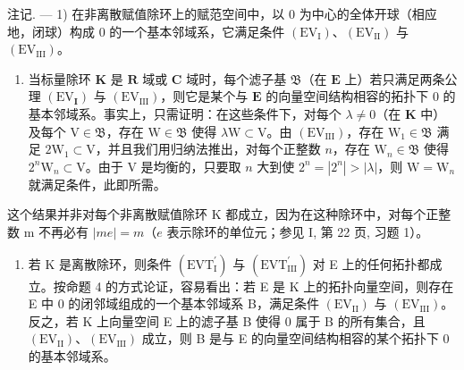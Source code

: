 注记. --- 1) 在非离散赋值除环上的赋范空间中，以 0 为中心的全体开球（相应地，闭球）构成 0 的一个基本邻域系，它满足条件 \((\mathrm{EV}_{\mathrm{I}})\)、\((\mathrm{EV}_{\mathrm{II}})\) 与 \((\mathrm{EV}_{\mathrm{III}})\)。

\begin{enumerate}
\def\labelenumi{\arabic{enumi})}
\setcounter{enumi}{1}
\tightlist
\item
  当标量除环 \(\mathbf{K}\) 是 \(\mathbf{R}\) 域或 \(\mathbf{C}\) 域时，每个滤子基 \(\mathfrak{B}\)（在 \(\mathbf{E}\) 上）若只满足两条公理 \((\mathrm{EV}_{\mathbf{I}})\) 与 \((\mathrm{EV}_{\mathrm{III}})\)，则它是某个与 \(\mathbf{E}\) 的向量空间结构相容的拓扑下 0 的基本邻域系。事实上，只需证明：在这些条件下，对每个 \(\lambda \neq 0\)（在 \(\mathbf{K}\) 中）及每个 \(\mathrm{V} \in \mathfrak{B}\)，存在 \(\mathrm{W} \in \mathfrak{B}\) 使得 \(\lambda \mathrm{W} \subset \mathrm{V}\)。由 \((\mathrm{EV}_{\mathrm{III}})\)，存在 \(\mathrm{W}_{1} \in \mathfrak{B}\) 满足 \(2\mathrm{W}_{1} \subset \mathrm{V}\)，并且我们用归纳法推出，对每个正整数 \(n\)，存在 \(\mathrm{W}_{n} \in \mathfrak{B}\) 使得 \(2^{n}\mathrm{W}_{n} \subset \mathrm{V}\)。由于 \(\mathrm{V}\) 是均衡的，只要取 \(n\) 大到使 \(2^{n} = |2^{n}| > |\lambda|\)，则 \(\mathrm{W} = \mathrm{W}_{n}\) 就满足条件，此即所需。
\end{enumerate}

这个结果并非对每个非离散赋值除环 K 都成立，因为在这种除环中，对每个正整数 m 不再必有 \(|me| = m\)（\(e\) 表示除环的单位元；参见 I, 第 22 页, 习题 1）。

\begin{enumerate}
\def\labelenumi{\arabic{enumi})}
\setcounter{enumi}{2}
\tightlist
\item
  若 K 是离散除环，则条件 \((\mathrm{EVT}_{\mathrm{I}}^{\prime})\) 与 \((\mathrm{EVT}_{\mathrm{III}}^{\prime})\) 对 E 上的任何拓扑都成立。按命题 4 的方式论证，容易看出：若 E 是 K 上的拓扑向量空间，则存在 E 中 0 的闭邻域组成的一个基本邻域系 B，满足条件 \((\mathrm{EV}_{\mathrm{II}})\) 与 \((\mathrm{EV}_{\mathrm{III}})\)。反之，若 K 上向量空间 E 上的滤子基 B 使得 0 属于 B 的所有集合，且 \((\mathrm{EV}_{\mathrm{II}})\)、\((\mathrm{EV}_{\mathrm{III}})\) 成立，则 B 是与 E 的向量空间结构相容的某个拓扑下 0 的基本邻域系。
\end{enumerate}

